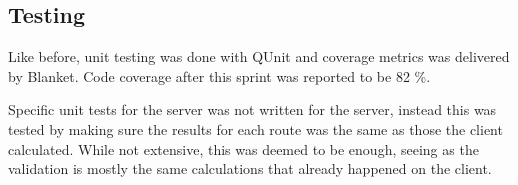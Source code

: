 \subsection{Testing}
Like before, unit testing was done with QUnit and coverage metrics was delivered by Blanket. Code coverage after this sprint was reported to be 82 \%.

Specific unit tests for the server was not written for the server, instead this was tested by making sure the results for each route was the same as those the client calculated. While not extensive, this was deemed to be enough, seeing as the validation is mostly the same calculations that already happened on the client.
